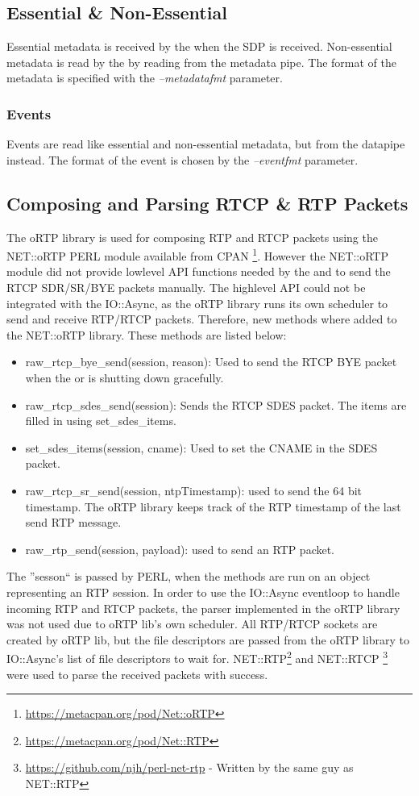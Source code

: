 \subsection{Essential \& Non-Essential} \label{sec:implementation:esssub}
Essential metadata is received by the \sub{} when the SDP is received. Non-essential metadata is read by the  \con{} by reading from the metadata pipe. The format of the metadata is specified with the \textit{--metadatafmt} parameter.

\subsubsection{Events} \label{sec:implementation:eventssub}
Events are read like essential and non-essential metadata, but from the datapipe instead. The format of the event is chosen by the \textit{--eventfmt} parameter.


\subsection{Composing and Parsing RTCP \& RTP Packets}
The oRTP library is used for composing RTP and RTCP packets using the NET::oRTP PERL module available from CPAN \footnote{\url{https://metacpan.org/pod/Net::oRTP}}. However the NET::oRTP module did not provide lowlevel API functions needed by the \pub{} and \sub{} to send the RTCP SDR/SR/BYE packets manually. The highlevel API could not be integrated with the IO::Async, as the oRTP library runs its own scheduler to send and receive RTP/RTCP packets. Therefore, new methods where added to the NET::oRTP library. These methods are listed below:

\begin{itemize}
	\item raw\_rtcp\_bye\_send(session, reason): Used to send the RTCP BYE packet when the \pub{} or \sub{} is shutting down gracefully.
	\item raw\_rtcp\_sdes\_send(session): Sends the RTCP SDES packet. The items are filled in using set\_sdes\_items.
	\item set\_sdes\_items(session, cname): Used to set the \ac{CNAME} in the SDES packet.
	\item raw\_rtcp\_sr\_send(session, ntpTimestamp): used to send the 64 bit timestamp. The oRTP library keeps track of the RTP timestamp of the last send RTP message.
	\item raw\_rtp\_send(session, payload): used to send an RTP packet.
\end{itemize}
The ''sesson`` is passed by PERL, when the methods are run on an object representing an RTP session. In order to use the IO::Async eventloop to handle incoming RTP and RTCP packets, the parser implemented in the oRTP library was not used due to oRTP lib's own scheduler. All RTP/RTCP sockets are created by oRTP lib, but the file descriptors are passed from the oRTP library to IO::Async's list of file descriptors to wait for.  NET::RTP\footnote{\url{https://metacpan.org/pod/Net::RTP}} and NET::RTCP \footnote{\url{https://github.com/njh/perl-net-rtp} - Written by the same guy as NET::RTP} were used to parse the received packets with success.\\

